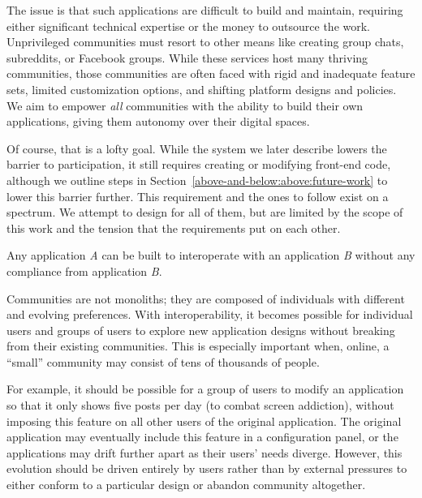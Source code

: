 The issue is that such applications are difficult to build and maintain,
requiring either significant technical expertise or the money to outsource the work.
Unprivileged communities must resort to other means like creating group chats,
subreddits, or Facebook groups. %
While these services host many thriving communities,
those communities are often faced with rigid and inadequate feature sets,
limited customization options, and shifting platform designs and policies.
We aim to empower \emph{all} communities with the ability to
build their own applications, giving them autonomy over their digital spaces.

Of course, that is a lofty goal. While the system
we later describe lowers the barrier to participation,
it still requires creating or modifying front-end code, although
we outline steps in Section~\ref{above-and-below:above:future-work}
to lower this barrier further.
This requirement and the ones to follow exist on a spectrum.
We attempt to design for all of them, but are limited by
the scope of this work and the tension that the requirements put
on each other.

\begin{requirement}
\label{requirements:adversarial-interop}
Any application \emph{A} can be built to interoperate with an application \emph{B} without any compliance from application \emph{B}.
\end{requirement}

Communities are not monoliths; they are composed of individuals
with different and evolving preferences.
With interoperability, it becomes possible for individual users and groups of users to explore new application designs
without breaking from their existing communities.
This is especially important when, online, a ``small''
community may consist of tens of thousands of people.

For example, it should be possible for a group of users to
modify an application so that it only shows five posts per day (to combat screen addiction),
without imposing this feature on all other users of the original application.
The original application may eventually include this feature in a configuration panel,
or the applications may drift further apart as their users' needs diverge. However, this
evolution should be driven entirely by users rather than by external pressures
to either conform to a particular design or abandon community altogether.


